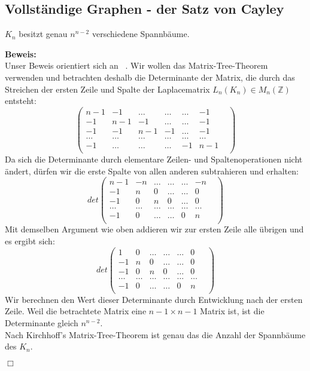 \subsection{Vollständige Graphen - der Satz von Cayley}
\begin{Tms}
$K_n$ besitzt genau $n^{n-2}$ verschiedene Spannbäume.\\
\end{Tms}
\textbf{Beweis:}\\
Unser Beweis orientiert sich an ~\cite{Lau_2004}.
Wir wollen das Matrix-Tree-Theorem verwenden und betrachten deshalb die Determinante der Matrix, die durch das Streichen der ersten Zeile und Spalte der Laplacematrix $L_n(K_n)\in M_n(\mathbb{Z})$ entsteht:
\begin{equation}
\begin{pmatrix}
n-1&-1&\ldots&\ldots&\ldots&-1\\
-1&n-1&-1&\ldots&\ldots&-1\\
-1&-1&n-1&-1&\ldots&-1\\
\ldots&\ldots&\ldots&\ldots&\ldots&\ldots&\\
-1&\ldots&\ldots&\ldots&-1&n-1\\
\end{pmatrix}
\end{equation}
Da sich die Determinante durch elementare Zeilen- und Spaltenoperationen nicht ändert, dürfen wir die erste Spalte von allen anderen subtrahieren und erhalten:
\begin{equation}det
\begin{pmatrix}
n-1&-n&\ldots&\ldots&\ldots&-n\\
-1&n&0&\ldots&\ldots&0\\
-1&0&n&0&\ldots&0\\
\ldots&\ldots&\ldots&\ldots&\ldots&\ldots&\\
-1&0&\ldots&\ldots&0&n\\
\end{pmatrix}
\end{equation}
Mit demselben Argument wie oben addieren wir zur ersten Zeile alle übrigen und es ergibt sich:
\begin{equation}
det
\begin{pmatrix}
1&0&\ldots&\ldots&\ldots&0\\
-1&n&0&\ldots&\ldots&0\\
-1&0&n&0&\ldots&0\\
\ldots&\ldots&\ldots&\ldots&\ldots&\ldots&\\
-1&0&\ldots&\ldots&0&n\\
\end{pmatrix}
\end{equation}
Wir berechnen den Wert dieser Determinante durch Entwicklung nach der ersten Zeile. Weil die betrachtete Matrix eine $n-1 \times n-1$ Matrix ist, ist die Determinante gleich $n^{n-2}$.\\
Nach Kirchhoff's Matrix-Tree-Theorem ist genau das die Anzahl der Spannbäume des $K_n$.
\begin{flushright} $\Box$ \end{flushright} 
